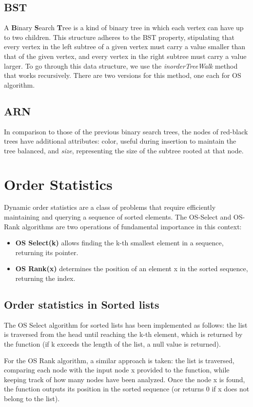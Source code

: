 \documentclass[11pt]{article}
\begin{document}
\subsection{BST}
A \textbf{B}inary \textbf{S}earch \textbf{T}ree is a kind of binary tree in which each vertex can have up to two children. This structure adheres to the BST property, stipulating that every vertex in the left subtree of a given vertex must carry a value smaller than that of the given vertex, and every vertex in the right subtree must carry a value larger. To go through this data structure, we use the \textit{inorderTreeWalk} method that works recursively. There are two versions for this method, one each for OS algorithm.
\subsection{ARN}
In comparison to those of the previous binary search trees, the nodes of red-black trees have additional attributes: color, useful during insertion to maintain the tree balanced, and \textit{size}, representing the size of the subtree rooted at that node.
\section{Order Statistics}
Dynamic order statistics are a class of problems that require efficiently maintaining and querying a sequence of sorted elements. The OS-Select and OS-Rank algorithms are two operations of fundamental importance in this context:
\begin{itemize}
    \item \textbf{OS Select(k)} allows finding the k-th smallest element in a sequence, returning its pointer. 
    \item \textbf{OS Rank(x) }determines the position of an element x in the sorted sequence, returning the index.
\end{itemize}
\subsection{Order statistics in Sorted lists}
The OS Select algorithm for sorted lists has been implemented as follows: the list is traversed from the head until reaching the k-th element, which is returned by the function (if k exceeds the length of the list, a null value is returned).

For the OS Rank algorithm, a similar approach is taken: the list is traversed, comparing each node with the input node x provided to the function, while keeping track of how many nodes have been analyzed. Once the node x is found, the function outputs its position in the sorted sequence (or returns 0 if x does not belong to the list).
\end{document}

